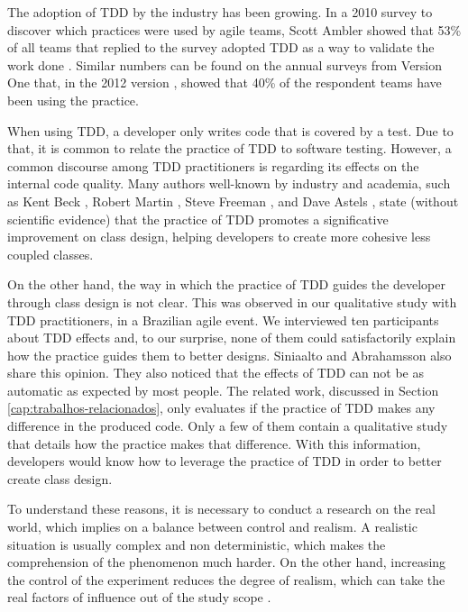 \documentclass[times]{elsarticle}
\begin{document}
The adoption of TDD by the industry has been growing. In a 2010 survey to discover
which practices were used by agile teams, Scott Ambler showed that 53\% of all teams
that replied to the survey adopted TDD as a way to validate the work done
\cite{wambler-survey-agile}. Similar numbers can be found on the annual surveys from
Version One that, in the 2012 version \cite{versionone-2012}, showed that
40\% of the respondent teams have been using the practice.

When using TDD, a developer only writes code that is covered by a test. Due
to that, it is common to relate the practice of TDD to software testing. However,
a common discourse among TDD practitioners is regarding its effects on the internal code quality.
Many authors well-known by industry and academia, such as Kent Beck \cite{TDDByExample}, 
Robert Martin \cite{agile-ppp}, Steve Freeman \cite{GOOS}, and Dave Astels \cite{astels-tdd}, 
state (without scientific evidence) that the practice of TDD promotes a significative
improvement on class design, helping developers to create more cohesive less coupled
classes.

On the other hand, the way in which the practice of TDD guides the developer
through class design is not clear. This was observed in our qualitative study
with TDD practitioners, in a Brazilian agile event. We interviewed
ten participants about TDD effects \cite{aniche-wbma} and, to our surprise,
none of them could satisfactorily explain how the practice guides them to better
designs.
Siniaalto and Abrahamsson \cite{alarming-results} also share this opinion. They also
noticed that the effects of TDD can not be as automatic as expected by most people.
The related work, discussed in Section \ref{cap:trabalhos-relacionados},
only evaluates if the practice of TDD makes any difference in the produced code. Only a few
of them contain a qualitative study that details how the practice makes that difference.
With this information, developers would know how to leverage the practice of TDD in order to 
better create class design.

To understand these reasons, it is necessary to conduct a research on the real world, which
implies on a balance between control and realism. A realistic situation is usually
complex and non deterministic, which makes the comprehension of the phenomenon much
harder. On the other hand, increasing the control of the experiment reduces the
degree of realism, which can take the real factors of influence out of the study
scope \cite{guidelines-case-study}.
\end{document}
